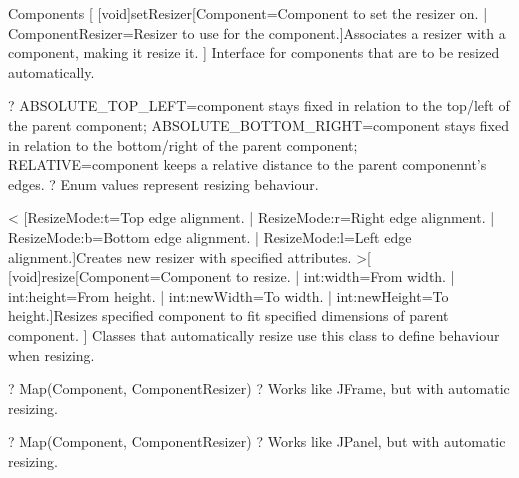 \begin{package}{Components}
    [
        \func{+}[void]{setResizer}[Component=Component to set the resizer on. | ComponentResizer=Resizer to use for the component.]{Associates a resizer with a component, making it resize it.}
    ]{
        Interface for components that are to be resized automatically.
    }

    ?
        ABSOLUTE\_TOP\_LEFT=component stays fixed in relation to the top/left of the parent component;
        ABSOLUTE\_BOTTOM\_RIGHT=component stays fixed in relation to the bottom/right of the parent component;
        RELATIVE=component keeps a relative distance to the parent componennt's edges.
    ?{
        Enum values represent resizing behaviour.
    }

    <
        [ResizeMode:t=Top edge alignment. | ResizeMode:r=Right edge alignment. | ResizeMode:b=Bottom edge alignment. | ResizeMode:l=Left edge alignment.]{Creates new resizer with specified attributes.}
    >[
        \func{+}[void]{resize}[Component=Component to resize. | int:width=From width. | int:height=From height. | int:newWidth=To width. | int:newHeight=To height.]{Resizes specified component to fit specified dimensions of parent component.}
    ]{
        Classes that automatically resize use this class to define behaviour when resizing.
    }

    ?
        Map(Component, ComponentResizer)
    ?{
        Works like JFrame, but with automatic resizing.
    }

    ?
        Map(Component, ComponentResizer)
    ?{
        Works like JPanel, but with automatic resizing.
    }

\end{package}

